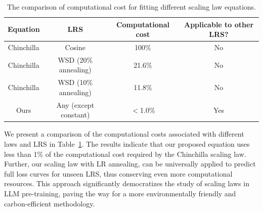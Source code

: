 \begin{table}[tbp]
\begin{center}
\caption{The comparison of computational cost for fitting different scaling law equations.}
\label{tab:green}
\begin{tabular}{cccc}
\toprule
\textbf{Equation}  & \textbf{LRS}  & \textbf{Computational cost} & \textbf{Applicable to other LRS?}
\\
\midrule
Chinchilla  & Cosine & 100\% &  No \\
Chinchilla  &  WSD (20\% annealing)   & 21.6\% & No \\
Chinchilla  &  WSD (10\% annealing)   & 11.8\% & No \\
Ours & Any (except constant) & $<$1.0\% & Yes \\
\bottomrule
\end{tabular}
\end{center}
\end{table}

We present a comparison of the computational costs associated with different laws and LRS in Table~\ref{tab:green}. The results indicate that our proposed equation uses less than 1\% of the computational cost required by the Chinchilla scaling law. Further, our scaling law with LR annealing, can be universally applied to predict full loss curves for unseen LRS, thus conserving even more computational resources. This approach significantly democratizes the study of scaling laws in LLM pre-training, paving the way for a more environmentally friendly and carbon-efficient methodology.
